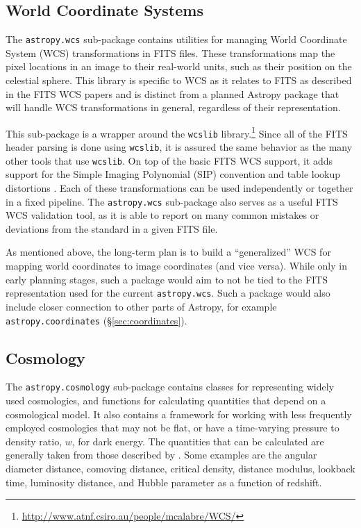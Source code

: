 \documentclass[traditabstract]{aa}
\begin{document}
\subsection{World Coordinate Systems}

\label{sec:wcs}


The \texttt{astropy.wcs} sub-package contains utilities for managing World
Coordinate System (WCS) transformations in FITS files. These transformations
map the pixel locations in an image to their real-world units, such as their
position on the celestial sphere. This library is specific to WCS as it relates
to FITS as described in the FITS WCS papers
\citep{greisen2002wcs,calabretta2002wcs,greisen2006wcs} and is distinct from a
planned Astropy package that will handle WCS transformations in general,
regardless of their representation.

This sub-package is a wrapper around the \texttt{wcslib} library.\footnote{\url{http://www.atnf.csiro.au/people/mcalabre/WCS/}} Since all of the FITS header parsing is done
using \texttt{wcslib}, it is assured the same behavior as the many other tools
that use \texttt{wcslib}. On top of the basic FITS WCS support, it adds support
for the Simple Imaging Polynomial (SIP) convention and table lookup distortions
\citep{calabretta_sip,sip}. Each of
these transformations can be used independently or together in a fixed
pipeline. The \texttt{astropy.wcs} sub-package also serves as a useful FITS WCS validation
tool, as it is able to report on many common mistakes or deviations from the
standard in a given FITS file.

As mentioned above, the long-term plan is to build a ``generalized'' WCS for mapping
world coordinates to image coordinates (and vice versa).  While only in early
planning stages, such a package would aim to not be tied to the FITS representation
used for the current \texttt{astropy.wcs}.  Such a package would also include
closer connection to other parts of Astropy, for example \texttt{astropy.coordinates} (\S\ref{sec:coordinates}).

\subsection{Cosmology}

\label{sec:cosmology}


The \texttt{astropy.cosmology} sub-package contains classes for representing
widely used cosmologies, and functions for calculating quantities that depend
on a cosmological model. It also contains a framework for working with less
frequently employed cosmologies that may not be flat, or have a time-varying
pressure to density ratio, $w$, for dark energy. The quantities that can be
calculated are generally taken from those described by \citet{Hogg99}. Some
examples are the angular diameter distance, comoving distance, critical
density, distance modulus, lookback time, luminosity distance, and Hubble
parameter as a function of redshift.
\end{document}
